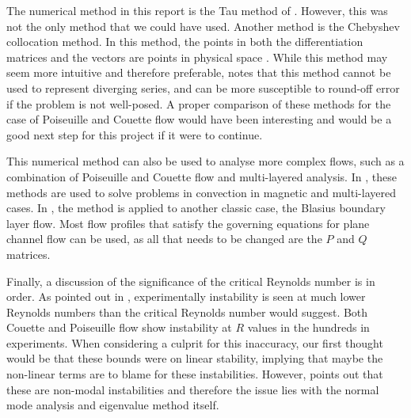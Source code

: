 The numerical method in this report is the Tau method of \citet{lanczos1988applied}. However, this was not the only method that we could have used. Another method is the Chebyshev collocation method. In this method, the points in both the differentiation matrices and the vectors are points in physical space \citep{canuto2007spectral}. While this method may seem more intuitive and therefore preferable, \citet{bukhari1997spectral} notes that this method cannot be used to represent diverging series, and can be more susceptible to round-off error if the problem is not well-posed. A proper comparison of these methods for the case of Poiseuille and Couette flow would have been interesting and would be a good next step for this project if it were to continue.

This numerical method can also be used to analyse more complex flows, such as a combination of Poiseuille and Couette flow and multi-layered analysis. In \citet{bukhari1997spectral}, these methods are used to solve problems in convection in magnetic and multi-layered cases. In \citet{antar1976eigenvalue}, the method is applied to another classic case, the Blasius boundary layer flow. Most flow profiles that satisfy the governing equations for plane channel flow can be used, as all that needs to be changed are the $ P $ and $Q$ matrices. 

Finally, a discussion of the significance of the critical Reynolds number is in order. As pointed out in \citet{trefethen1993hydrodynamic}, experimentally instability is seen at much lower Reynolds numbers than the critical Reynolds number would suggest. Both Couette and Poiseuille flow show instability at $R$ values in the hundreds in experiments. When considering a culprit for this inaccuracy, our first thought would be that these bounds were on linear stability, implying that maybe the non-linear terms are to blame for these instabilities. However, \citet{trefethen1993hydrodynamic} points out that these are non-modal instabilities and therefore the issue lies with the normal mode analysis and eigenvalue method itself. 




